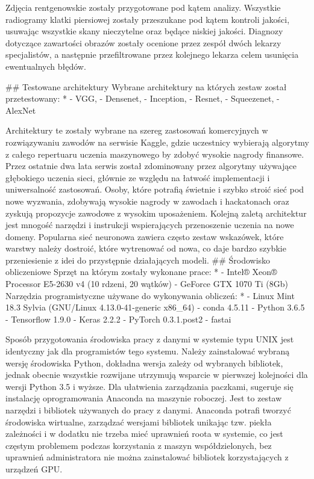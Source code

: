 \documentclass[12pt,a4paper,twoside,titlepage,openright]{book}
\begin{document}
Zdjęcia rentgenowskie zostały przygotowane pod kątem analizy. Wszystkie radiogramy klatki piersiowej zostały przeszukane pod kątem kontroli jakości, usuwając wszystkie skany nieczytelne oraz będące niskiej jakości. Diagnozy dotyczące zawartości obrazów zostały ocenione przez zespół dwóch lekarzy specjalistów, a następnie przefiltrowane przez kolejnego lekarza celem usunięcia ewentualnych błędów.

## Testowane architektury
Wybrane architektury na których zestaw został przetestowany:
*
- VGG,
- Densenet,
- Inception,
- Resnet,
- Squeezenet,
- AlexNet

Architektury te zostały wybrane na szereg zastosowań komercyjnych w rozwiązywaniu zawodów na serwisie Kaggle, gdzie uczestnicy wybierają algorytmy z całego repertuaru uczenia maszynowego by zdobyć wysokie nagrody finansowe. Przez ostatnie dwa lata serwis został zdominowany przez algorytmy używające głębokiego uczenia sieci, głównie ze względu na łatwość implementacji i uniwersalność zastosowań. Osoby, które potrafią świetnie i szybko stroić sieć pod nowe wyzwania, zdobywają wysokie nagrody w zawodach i hackatonach oraz zyskują propozycje zawodowe z wysokim uposażeniem. Kolejną zaletą architektur jest mnogość narzędzi i instrukcji wspierających przenoszenie uczenia na nowe domeny. Popularna sieć neuronowa zawiera często zestaw wskazówek, które warstwy należy dostroić, które wytrenować od nowa, co daje bardzo szybkie przeniesienie z idei do przystępnie działających modeli.
## Środowisko obliczeniowe
Sprzęt na którym zostały wykonane prace:
*
- Intel® Xeon® Processor E5-2630 v4 (10 rdzeni, 20 wątków)
- GeForce GTX 1070 Ti (8Gb)
Narzędzia programistyczne używane do wykonywania obliczeń:
*
- Linux Mint 18.3 Sylvia (GNU/Linux 4.13.0-41-generic x86\_64)
- conda 4.5.11
- Python 3.6.5
- Tensorflow 1.9.0
- Keras 2.2.2
- PyTorch 0.3.1.post2
- fastai

Sposób przygotowania środowiska pracy z danymi w systemie typu UNIX jest identyczny jak dla programistów tego systemu. Należy zainstalować wybraną wersję środowiska Python, dokładna wersja zależy od wybranych bibliotek, jednak obecnie wszystkie rozwijane utrzymują wsparcie w pierwszej kolejności dla wersji Python 3.5 i wyższe. Dla ułatwienia zarządzania paczkami, sugeruje się instalację oprogramowania Anaconda na maszynie roboczej. Jest to zestaw narzędzi i bibliotek używanych do pracy z danymi. Anaconda potrafi tworzyć środowiska wirtualne, zarządzać wersjami bibliotek unikając tzw. piekła zależności i w dodatku nie trzeba mieć uprawnień roota w systemie, co jest częstym problemem podczas korzystania z maszyn współdzielonych, bez uprawnień administratora nie można zainstalować bibliotek korzystających z urządzeń GPU.
\end{document}
